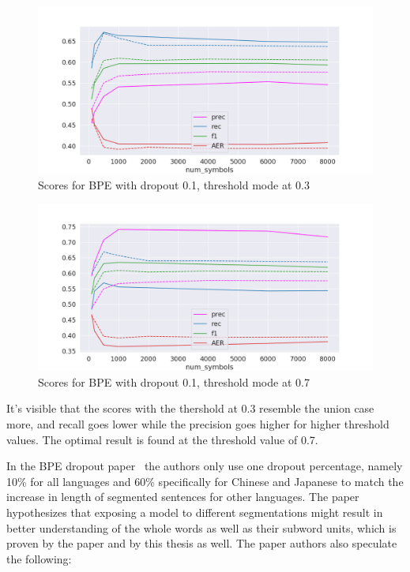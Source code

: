 \begin{figure}[!ht]
    \centering
    \includegraphics[width=11.5cm]{../reports/scores_dropout_bpe/space/0.1/0.3_thres_fastalign.png}
    \caption{Scores for BPE with dropout 0.1, threshold mode at 0.3}
\end{figure}

\begin{figure}[!ht]
    \centering
    \includegraphics[width=11.5cm]{../reports/scores_dropout_bpe/space/0.1/0.7_thres_fastalign.png}
    \caption{Scores for BPE with dropout 0.1, threshold mode at 0.7}
\end{figure}

It's visible that the scores with the thershold at 0.3 resemble the union case more, and recall goes lower while the precision goes higher for higher threshold values. The optimal result is found at the threshold value of 0.7.

In the BPE dropout paper~\cite{provilkov2019bpedropout} the authors only use one dropout percentage, namely 10\% for all languages and 60\% specifically for Chinese and Japanese to match the increase in length of segmented sentences for other languages. The paper hypothesizes that exposing a model to different segmentations might result in better understanding of the whole words as well as their subword units, which is proven by the paper and by this thesis as well. The paper authors also speculate the following:

